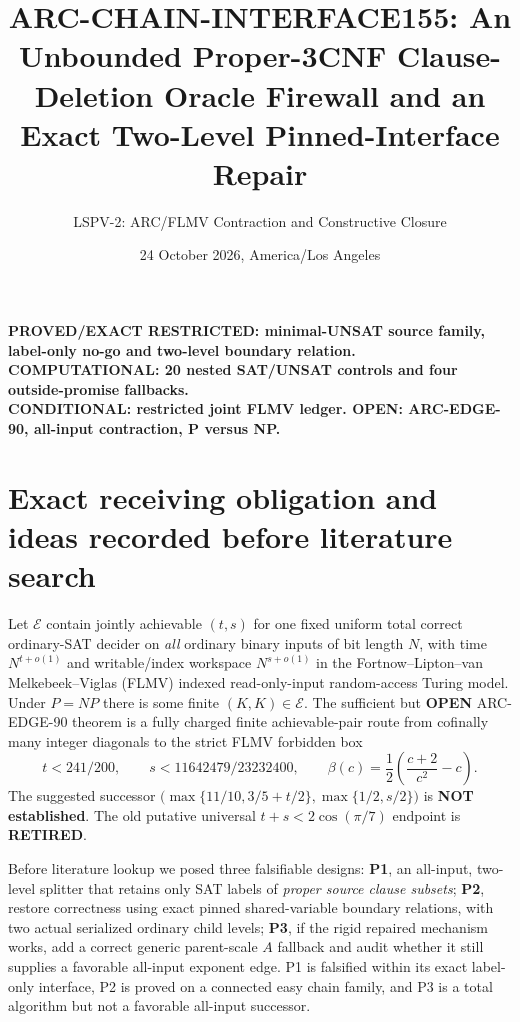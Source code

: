 \documentclass[11pt]{article}
\title{ARC-CHAIN-INTERFACE155: An Unbounded Proper-3CNF Clause-Deletion Oracle Firewall and an Exact Two-Level Pinned-Interface Repair}
\author{LSPV-2: ARC/FLMV Contraction and Constructive Closure}
\date{24 October 2026, America/Los Angeles}
\begin{document}
\maketitle
\begin{center}
\textbf{PROVED/EXACT RESTRICTED: minimal-UNSAT source family, label-only no-go and two-level boundary relation.}\\
\textbf{COMPUTATIONAL: 20 nested SAT/UNSAT controls and four outside-promise fallbacks.}\\
\textbf{CONDITIONAL: restricted joint FLMV ledger. OPEN: ARC-EDGE-90, all-input contraction, P versus NP.}
\end{center}

\section{Exact receiving obligation and ideas recorded before literature search}
Let $\mathcal E$ contain jointly achievable $(t,s)$ for one fixed uniform total correct ordinary-SAT decider on \emph{all} ordinary binary inputs of bit length $N$, with time $N^{t+o(1)}$ and writable/index workspace $N^{s+o(1)}$ in the Fortnow--Lipton--van Melkebeek--Viglas (FLMV) indexed read-only-input random-access Turing model. Under $P=NP$ there is some finite $(K,K)\in\mathcal E$. The sufficient but \textbf{OPEN} ARC-EDGE-90 theorem is a fully charged finite achievable-pair route from cofinally many integer diagonals to the strict FLMV forbidden box
\[
t<241/200,\qquad s<11642479/23232400,\qquad
\beta(c)=\frac12\left(\frac{c+2}{c^2}-c\right).
\]
The suggested successor $\bigl(\max\{11/10,3/5+t/2\},\max\{1/2,s/2\}\bigr)$ is \textbf{NOT established}. The old putative universal $t+s<2\cos(\pi/7)$ endpoint is \textbf{RETIRED}.

Before literature lookup we posed three falsifiable designs: \textbf{P1}, an all-input, two-level splitter that retains only SAT labels of \emph{proper source clause subsets}; \textbf{P2}, restore correctness using exact pinned shared-variable boundary relations, with two actual serialized ordinary child levels; \textbf{P3}, if the rigid repaired mechanism works, add a correct generic parent-scale $A$ fallback and audit whether it still supplies a favorable all-input exponent edge. P1 is falsified within its exact label-only interface, P2 is proved on a connected easy chain family, and P3 is a total algorithm but not a favorable all-input successor.
\end{document}
